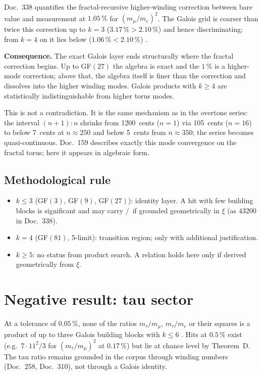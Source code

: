 Doc.~338 quantifies the fractal-recursive higher-winding correction between bare
value and measurement at $1.05\,\%$ for $(m_\mu/m_e)^2$. The Galois grid is coarser
than twice this correction up to $k = 3$ ($3.17\,\% > 2.10\,\%$) and hence
discriminating; from $k = 4$ on it lies below ($1.06\,\% < 2.10\,\%$) \BM.

\textbf{Consequence.} The exact Galois layer ends structurally where the fractal
correction begins. Up to GF$(27)$ the algebra is exact and the $1\,\%$ is a
higher-mode correction; above that, the algebra itself is finer than the correction
and dissolves into the higher winding modes. Galois products with $k \geq 4$ are
statistically indistinguishable from higher torus modes.

This is not a contradiction. It is the same mechanism as in the overtone series:
the interval $(n{+}1) : n$ shrinks from 1200~cents ($n=1$) via 105~cents ($n=16$)
to below 7~cents at $n \approx 250$ and below 5~cents from $n \approx 350$; the series becomes quasi-continuous. Doc.~159
describes exactly this mode convergence on the fractal torus; here it appears in
algebraic form.

\subsection{Methodological rule}

\begin{itemize}
  \item $k \leq 3$ (GF$(3)$, GF$(9)$, GF$(27)$): identity layer. A hit with few
        building blocks is significant and may carry \KM/\BM\ if grounded
        geometrically in $\xi$ (as $43200$ in Doc.~338).
  \item $k = 4$ (GF$(81)$, 5-limit): transition region; only with additional
        justification.
  \item $k \geq 5$: no status from product search. A relation holds here only if
        derived geometrically from $\xi$.
\end{itemize}

\section{Negative result: tau sector}

At a tolerance of $0.05\,\%$, none of the ratios $m_\tau/m_\mu$, $m_\tau/m_e$ or
their squares is a product of up to three Galois building blocks with $k \leq 6$
\SM. Hits at $0.5\,\%$ exist (e.g.\ $7 \cdot 11^2/3$ for $(m_\tau/m_\mu)^2$ at
$0.17\,\%$) but lie at chance level by Theorem~D. The tau ratio remains grounded in
the corpus through winding numbers (Doc.~258, Doc.~310), not through a Galois identity.

